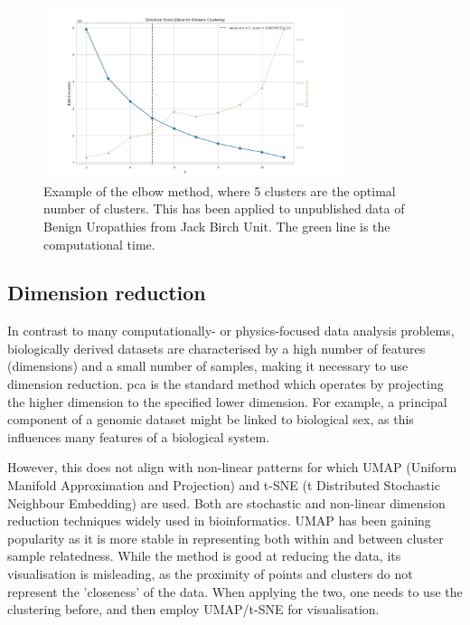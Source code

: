 \begin{figure}[!htb]
  \centering\includegraphics[width=0.8\textwidth,height=0.8\textheight,keepaspectratio]{Sections/Lit_review/Resources/elbow_method.png}
    \caption{Example of the elbow method, where 5 clusters are the optimal number of clusters. This has been applied to unpublished data of Benign Uropathies from Jack Birch Unit. The green line is the computational time. }
    \label{fig:elbow_method}
\end{figure}
\FloatBarrier


\subsection{Dimension reduction} \label{s:lit:dim_red}

In contrast to many computationally- or physics-focused data analysis problems, biologically derived datasets are characterised by a high number of features (dimensions) and a small number of samples, making it necessary to use dimension reduction. \acrfull{pca} is the standard method which operates by projecting the higher dimension to the specified lower dimension. For example, a principal component of a genomic dataset might be linked to biological sex, as this influences many features of a biological system.

However, this does not align with non-linear patterns for which UMAP (Uniform Manifold Approximation and Projection) and t-SNE (t Distributed Stochastic Neighbour Embedding) are used. Both are stochastic and non-linear dimension reduction techniques widely used in bioinformatics. UMAP has been gaining popularity as it is more stable in representing both within and between cluster sample relatedness. While the method is good at reducing the data, its visualisation is misleading, as the proximity of points and clusters do not represent the 'closeness' of the data. When applying the two, one needs to use the clustering before, and then employ UMAP/t-SNE for visualisation.

